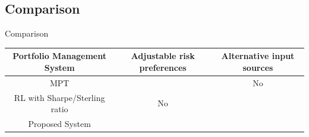 \subsection{Comparison}
\begin{frame}{Comparison}
    \centering
    \begin{tabular}{|| c|c|c|| }
    \hline \hline
    Portfolio Management System & Adjustable risk preferences & Alternative input sources \\     \hline \hline
    MPT & \color{blue}{Yes} & No \\  \hline
    RL with Sharpe/Sterling ratio& No & \color{blue}{Yes}  \\  \hline
    Proposed System & \color{blue}{Yes} & \color{blue}{Yes} \\   \hline \hline
    \end{tabular}

\end{frame}